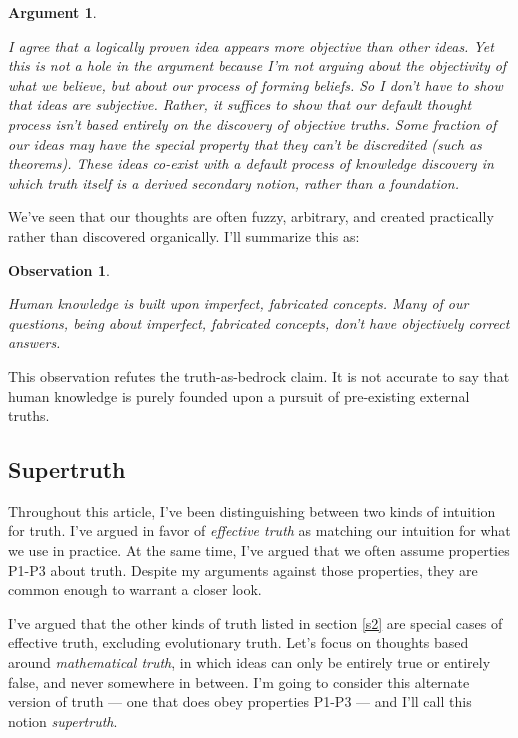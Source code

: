 \documentclass[11pt, oneside]{article}
\newtheorem{obs}{Observation}
\theoremstyle{argtstyle}
\newtheorem*{argt}{Argument}
\begin{document}
\begin{argt}
\begin{itemize}
        I agree that a logically proven idea appears more objective than other
        ideas.
        Yet this is not a hole in the argument because I'm not arguing about the
        objectivity of what we believe, but about our process of forming
        beliefs.
        So I don't have to show that ideas are subjective.
        Rather, it suffices to show that our default thought process isn't based
        entirely on the discovery of objective truths.
        Some fraction of our
        ideas may have the special property that they can't be discredited
        (such as theorems).
        These ideas co-exist with a default process of knowledge discovery in
        which truth itself is a derived secondary notion, rather than a
        foundation.
\end{itemize}
\end{argt}

We've seen that our thoughts are often fuzzy, arbitrary, and created practically
rather than discovered organically. I'll summarize this as:
\newcommand{\obsnine}{
Human knowledge is
built upon imperfect, fabricated concepts.
Many of our questions, being about imperfect,
fabricated concepts,
don't have objectively correct answers.
}
\begin{obs}\label{o9}
    \obsnine
\end{obs}

This observation refutes the truth-as-bedrock claim.
It is not accurate to say that human knowledge is purely founded upon a
pursuit of pre-existing external truths.

\subsection{Supertruth}\label{supertruth}

Throughout this article, I've been distinguishing between two kinds of intuition
for truth.
I've argued in favor of {\em effective truth} as matching our intuition for what
we use in practice.
At the same time, I've argued that we often assume properties P1-P3 about truth.
Despite my arguments against those properties, they are common enough to warrant
a closer look.

I've argued that the other kinds of truth listed in section \ref{s2}
are special cases of effective truth, excluding evolutionary truth.
Let's focus on thoughts based around {\em mathematical truth}, in which ideas
can only be
entirely true or entirely false, and never somewhere in between.
I'm going to consider this alternate version
of truth --- one that does obey properties P1-P3 --- and I'll call this notion
{\em supertruth}.
\end{document}
